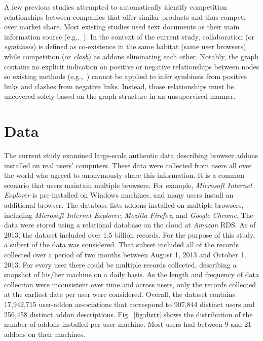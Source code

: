 \documentclass[10pt,letterpaper]{article}
\begin{document}
A few previous studies attempted to automatically identify competition relationships between companies that offer similar products and thus compete over market share. Most existing studies used text documents as their main information source (e.g.,~\cite{baoTKDE08,yangCIKM12}). In the context of the current study, collaboration (or \textit{symbiosis}) is defined as co-existence in the same habitat (same user browsers) while competition (or \textit{clash}) as addons eliminating each other. Notably, the graph contains no explicit indication on positive or negative relationships between nodes so existing methods (e.g.,~\cite{kunegisWWW08,kerchoveICDM08}) cannot be applied to infer symbiosis from positive links and clashes from negative links. Instead, those relationships must be uncovered solely based on the graph structure in an unsupervised manner.


\section*{Data}

The current study examined large-scale authentic data describing browser addons installed on real users' computers. These data were collected from users all over the world who agreed to anonymously share this information. It is a common scenario that users maintain multiple browsers. For example, \textit{Microsoft Internet Explorer} is pre-installed on Windows machines, and many users install an additional browser. The database lists addons installed on multiple browsers, including \textit{Microsoft Internet Explorer}, \textit{Mozilla Firefox}, and \textit{Google Chrome}. The data were stored using a relational database on the cloud at \textit{Amazon} RDS. As of 2013, the dataset included over 1.5 billion records. For the purpose of this study, a subset of the data was considered. That subset included all of the records collected over a period of two months between August 1, 2013 and October 1, 2013. For every user there could be multiple records collected, describing a snapshot of his/her machine on a daily basis. As the length and frequency of data collection were inconsistent over time and across users, only the records collected at the earliest date per user were considered. Overall, the dataset contains 17,942,715 user-addon associations that correspond to 907,844 distinct users and 256,458 distinct addon descriptions. Fig.~\ref{fig:distr} shows the distribution of the number of addons installed per user machine. Most users had between 9 and 21 addons on their machines.
\end{document}
